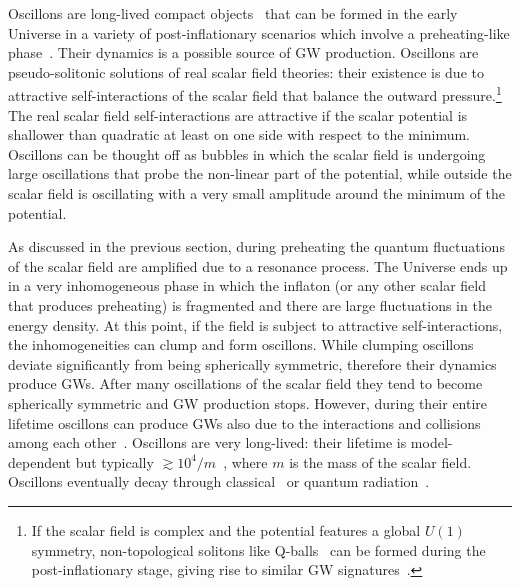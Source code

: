 \documentclass[11pt,a4paper]{article}
\begin{document}
Oscillons are long-lived compact objects~\cite{Gleiser:1993pt} that can be formed in the early Universe in a variety of post-inflationary scenarios which involve a preheating-like phase~\cite{Amin:2010jq, Amin:2010dc, Amin:2011hj, Zhou:2013tsa, Amin:2013ika, Lozanov:2014zfa, Antusch:2015vna, Antusch:2015ziz, Antusch:2016con, Antusch:2017flz, Antusch:2017vga, Lozanov:2017hjm, Amin:2018xfe, Antusch:2019qrr, Sang:2019ndv, Lozanov:2019ylm, Fodor:2019ftc, Hiramatsu:2020obh}. Their dynamics is a possible source of GW production. Oscillons are pseudo-solitonic solutions of real scalar field theories: their existence is due to attractive self-interactions of the scalar field that balance the outward pressure.\footnote{If the scalar field is complex and the potential features a global $U(1)$ symmetry, non-topological solitons like Q-balls~\cite{Coleman:1985ki} can be formed during the post-inflationary stage, giving rise to  similar GW signatures~\cite{Chiba:2009zu}.} The real scalar field self-interactions are attractive if the scalar potential is shallower than quadratic at least on one side with respect to the minimum. Oscillons can be thought off as bubbles in which the scalar field is undergoing large oscillations that probe the non-linear part of the potential, while outside the scalar field is oscillating with a very small amplitude around the minimum of the potential.

As discussed in the previous section, during preheating the quantum fluctuations of the scalar field are amplified due to a resonance process. The Universe ends up in a very inhomogeneous phase in which the inflaton (or any other scalar field that produces preheating) is fragmented and there are large fluctuations in the energy density. At this point, if the field is subject to attractive self-interactions, the inhomogeneities can clump and form oscillons. While clumping oscillons deviate significantly from being spherically symmetric, therefore their dynamics produce GWs. After many oscillations of the scalar field they tend to become spherically symmetric and GW production stops. However, during their entire lifetime oscillons can produce GWs also due to the interactions and collisions among each other~\cite{Helfer:2018vtq}. Oscillons are very long-lived: their lifetime is model-dependent but typically $\gtrsim 10^4 /m$~\cite{Gleiser:2008ty, Amin:2010jq, Amin:2010dc, Amin:2011hj, Salmi:2012ta, Saffin:2014yka, Antusch:2019qrr, Gleiser:2019rvw, Zhang:2020bec}, where $m$ is the mass of the scalar field. Oscillons eventually decay through classical~\cite{Segur:1987mg} or quantum radiation~\cite{Hertzberg:2010yz}.
\end{document}
